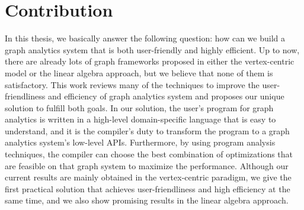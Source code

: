 \documentclass{sokendai_thesis} %
\begin{document}





\section{Contribution}

In this thesis, we basically answer the following question: how can we build a graph analytics system that is both user-friendly and highly efficient.
Up to now, there are already lots of graph frameworks proposed in either the vertex-centric model or the linear algebra approach, but we believe that none of them is satisfactory.
This work reviews many of the techniques to improve the user-friendliness and efficiency of graph analytics system and proposes our unique solution to fulfill both goals.
In our solution, the user's program for graph analytics is written in a high-level domain-specific language that is easy to understand, and it is the compiler's duty to transform the program to a graph analytics system's low-level APIs.
Furthermore, by using program analysis techniques, the compiler can choose the best combination of optimizations that are feasible on that graph system to maximize the performance.
Although our current results are mainly obtained in the vertex-centric paradigm, we give the first practical solution that achieves user-friendliness and high efficiency at the same time, and we also show promising results in the linear algebra approach.
\end{document}
